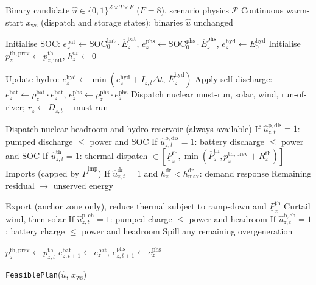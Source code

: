 \documentclass{article}
\begin{document}
\begin{algorithm}[htbp]
\caption{Pass-through warm-start decoder}
\label{alg:decoder}
\begin{algorithmic}[1]
\Require Binary candidate $\hat{u} \in \{0,1\}^{Z \times T \times F}$ ($F{=}8$), scenario physics $\mathcal{P}$
\Ensure Continuous warm-start $x_{\mathrm{ws}}$ (dispatch and storage states); binaries $\hat{u}$ unchanged

\State Initialise SOC: $e^{\mathrm{bat}}_z \gets \mathrm{SOC}_0^{\mathrm{bat}} \cdot \overline{E}^{\mathrm{bat}}_z$, \; $e^{\mathrm{phs}}_z \gets \mathrm{SOC}_0^{\mathrm{phs}} \cdot \overline{E}^{\mathrm{phs}}_z$, \; $e^{\mathrm{hyd}}_z \gets E_0^{\mathrm{hyd}}$
\State Initialise $p^{\mathrm{th,prev}}_z \gets p^{\mathrm{th}}_{z,\mathrm{init}}$, \; $h^{\mathrm{dr}}_z \gets 0$ 

  \State Update hydro: $e^{\mathrm{hyd}}_z \gets \min(e^{\mathrm{hyd}}_z + I_{z,t} \Delta t, \, \overline{E}^{\mathrm{hyd}}_z)$
  \State Apply self-discharge: $e^{\mathrm{bat}}_z \gets \rho^{\mathrm{bat}}_z \cdot e^{\mathrm{bat}}_z$, \; $e^{\mathrm{phs}}_z \gets \rho^{\mathrm{phs}}_z \cdot e^{\mathrm{phs}}_z$
  \State Dispatch nuclear must-run, solar, wind, run-of-river; $r_z \gets D_{z,t} - \text{must-run}$ 

   
    \State Dispatch nuclear headroom and hydro reservoir (always available)
    \State If $\hat{u}^{\mathrm{p,dis}}_{z,t}{=}1$: pumped discharge $\leq$ power and SOC
    \State If $\hat{u}^{\mathrm{b,dis}}_{z,t}{=}1$: battery discharge $\leq$ power and SOC
    \State If $\hat{u}^{\mathrm{th}}_{z,t}{=}1$: thermal dispatch $\in [\underline{P}^{\mathrm{th}}_z, \min(\overline{P}^{\mathrm{th}}_z, p^{\mathrm{th,prev}}_z + R^{\mathrm{th}}_z)]$
    \State Imports (capped by $\overline{P}^{\mathrm{imp}}$)
    \State If $\hat{u}^{\mathrm{dr}}_{z,t}{=}1$ and $h^{\mathrm{dr}}_z < h^{\mathrm{dr}}_{\max}$: demand response
    \State Remaining residual $\to$ unserved energy
  \EndFor

   
    \State Export (anchor zone only), reduce thermal subject to ramp-down and $\underline{P}^{\mathrm{th}}_z$
    \State Curtail wind, then solar
    \State If $\hat{u}^{\mathrm{p,ch}}_{z,t}{=}1$: pumped charge $\leq$ power and headroom
    \State If $\hat{u}^{\mathrm{b,ch}}_{z,t}{=}1$: battery charge $\leq$ power and headroom
    \State Spill any remaining overgeneration
  \EndFor

  \State $p^{\mathrm{th,prev}}_z \gets p^{\mathrm{th}}_{z,t}$ 
  \State $e^{\mathrm{bat}}_{z,t+1} \gets e^{\mathrm{bat}}_z$, \; $e^{\mathrm{phs}}_{z,t+1} \gets e^{\mathrm{phs}}_z$
\EndFor

\State \Return \texttt{FeasiblePlan}($\hat{u}$, $x_{\mathrm{ws}}$)
\end{algorithmic}
\end{algorithm}
\end{document}
